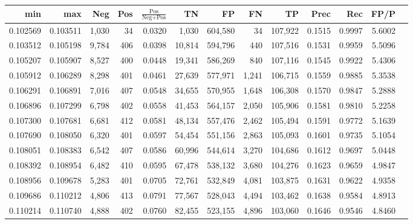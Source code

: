 \begin{tabular}{rrrrrrrrrrrrr}
\toprule
     min &      max &   Neg & Pos & $\frac{\text{Pos}}{\text{Neg}+\text{Pos}}$ &      TN &      FP &      FN &      TP &   Prec &    Rec &   FP/P \\
\midrule
0.102569 & 0.103511 & 1,030 &  34 &                                     0.0320 &   1,030 & 604,580 &      34 & 107,922 & 0.1515 & 0.9997 & 5.6002 \\
0.103512 & 0.105198 & 9,784 & 406 &                                     0.0398 &  10,814 & 594,796 &     440 & 107,516 & 0.1531 & 0.9959 & 5.5096 \\
0.105207 & 0.105907 & 8,527 & 400 &                                     0.0448 &  19,341 & 586,269 &     840 & 107,116 & 0.1545 & 0.9922 & 5.4306 \\
0.105912 & 0.106289 & 8,298 & 401 &                                     0.0461 &  27,639 & 577,971 &   1,241 & 106,715 & 0.1559 & 0.9885 & 5.3538 \\
0.106291 & 0.106891 & 7,016 & 407 &                                     0.0548 &  34,655 & 570,955 &   1,648 & 106,308 & 0.1570 & 0.9847 & 5.2888 \\
0.106896 & 0.107299 & 6,798 & 402 &                                     0.0558 &  41,453 & 564,157 &   2,050 & 105,906 & 0.1581 & 0.9810 & 5.2258 \\
0.107300 & 0.107681 & 6,681 & 412 &                                     0.0581 &  48,134 & 557,476 &   2,462 & 105,494 & 0.1591 & 0.9772 & 5.1639 \\
0.107690 & 0.108050 & 6,320 & 401 &                                     0.0597 &  54,454 & 551,156 &   2,863 & 105,093 & 0.1601 & 0.9735 & 5.1054 \\
0.108051 & 0.108383 & 6,542 & 407 &                                     0.0586 &  60,996 & 544,614 &   3,270 & 104,686 & 0.1612 & 0.9697 & 5.0448 \\
0.108392 & 0.108954 & 6,482 & 410 &                                     0.0595 &  67,478 & 538,132 &   3,680 & 104,276 & 0.1623 & 0.9659 & 4.9847 \\
0.108956 & 0.109678 & 5,283 & 401 &                                     0.0705 &  72,761 & 532,849 &   4,081 & 103,875 & 0.1631 & 0.9622 & 4.9358 \\
0.109686 & 0.110212 & 4,806 & 413 &                                     0.0791 &  77,567 & 528,043 &   4,494 & 103,462 & 0.1638 & 0.9584 & 4.8913 \\
0.110214 & 0.110740 & 4,888 & 402 &                                     0.0760 &  82,455 & 523,155 &   4,896 & 103,060 & 0.1646 & 0.9546 & 4.8460 \\

\end{tabular}
